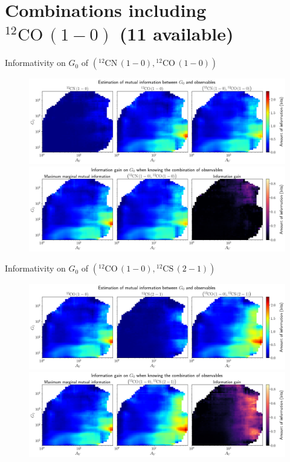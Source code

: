 \documentclass{beamer}
\begin{document}
\section{Combinations including $\mathrm{^{12}CO\,(1-0)}$ (11 available)}

\begin{frame}{Informativity on $G_0$ of $\left(\mathrm{^{12}CN\,(1-0)},\mathrm{^{12}CO\,(1-0)}\right)$}
    \begin{figure}
        \centering
        \includegraphics[width=0.95\linewidth]{../mi/g0__12cn10_12co10_mi.png}
        \vfill
        \includegraphics[width=0.95\linewidth]{../mi/g0__12cn10_12co10_mi_gain.png}
    \end{figure}
\end{frame}

\begin{frame}{Informativity on $G_0$ of $\left(\mathrm{^{12}CO\,(1-0)},\mathrm{^{12}CS\,(2-1)}\right)$}
    \begin{figure}
        \centering
        \includegraphics[width=0.95\linewidth]{../mi/g0__12co10_12cs21_mi.png}
        \vfill
        \includegraphics[width=0.95\linewidth]{../mi/g0__12co10_12cs21_mi_gain.png}
    \end{figure}
\end{frame}
\end{document}
